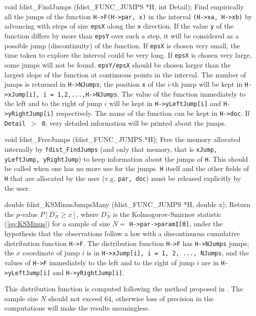 void fdist_FindJumps (fdist_FUNC_JUMPS *H, int Detail);
\endcode
 \tab
   Find empirically all the jumps of the function  {\tt H->F(H->par, x)}
   in the interval  {\tt (H->xa, H->xb)} by advancing with steps of size
   {\tt epsX} along the  {\tt x} direction. If the value {\tt y} of the
   function differs by more than  {\tt epsY} over such a step, it will be
   considered as a possible jump (discontinuity) of the function.
   If {\tt epsX} is chosen very small, the time taken to explore the
   interval could be very long. If {\tt epsX} is chosen very large, some
   jumps will not be found.
   {\tt epsY/epsX} should be chosen larger than the largest
   slope of the function at continuous points in the interval.
   The number of jumps is returned in  {\tt H->NJumps}; the position
   {\tt x} of the $i$-th jump will be kept in
   {\tt H->xJump[i], i = 1,2,...,H->NJumps}.
   The value of the function  immediately to the left and to the right
   of jump $i$ will be kept in {\tt H->yLeftJump[i]} and
   {\tt H->yRightJump[i]} respectively. The name of the function can be
   kept in {\tt H->doc}.
   If {\tt Detail $>$ 0}, very detailed information will be printed about
   the jumps.
 \endtab
\code


void fdist_FreeJumps (fdist_FUNC_JUMPS *H);
\endcode
 \tab
  Free the memory allocated internally by {\tt fdist\_FindJumps} (and only
  that memory, that is {\tt xJump, yLeftJump, yRightJump})
  to keep information about the jumps of {\tt H}.
  This should be called when one has no more use for the jumps. {\tt H}
  itself and the other fields of {\tt H} that are allocated by
  the user  (v.g. {\tt par, doc}) must be released explicitly by the user.
 \endtab
\code


double fdist_KSMinusJumpsMany (fdist_FUNC_JUMPS *H, double x);
\endcode
 \tab
  Return the $p$-value $P[D_{\!N}^- \ge x]$, where $D_{\!N}^-$ is the
  Kolmogorov-Smirnov statistic (\ref{eq:KSMinus}) for a sample of size
  $N =$  {\tt H->par->paramI[0]}, under
  the hypothesis that the observations follow a  law with a discontinuous
  cumulative distribution function  {\tt H->F}. The distribution function
  {\tt H->F} has {\tt H->NJumps} jumps;  the $x$ coordinate of jump $i$
  is in {\tt H->xJump[i], i = 1, 2, ..., NJumps}, and the values of {\tt H->F}
  immediately to the left and to the right of jump $i$ are in
  {\tt H->yLeftJump[i]} and {\tt H->yRightJump[i]}.

  This distribution function is computed following the method
  proposed in \cite{tCON72a}. The sample size  $N$ should not exceed
  64, otherwise loss of precision in the computations
  will make the results meaningless.
  \endtab
\code



